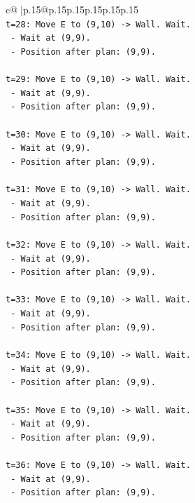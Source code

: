 \documentclass{article}
\begin{document}
{\begin{supertabular}{c@{$\;$}|p{.15\linewidth}@{}p{.15\linewidth}p{.15\linewidth}p{.15\linewidth}p{.15\linewidth}p{.15\linewidth}}
{{{\\ 
\texttt{t=28: Move E to (9,10) {-}> Wall. Wait.} \\
\texttt{   {-} Wait at (9,9).} \\
\texttt{   {-} Position after plan: (9,9).} \\
\\ 
\texttt{t=29: Move E to (9,10) {-}> Wall. Wait.} \\
\texttt{   {-} Wait at (9,9).} \\
\texttt{   {-} Position after plan: (9,9).} \\
\\ 
\texttt{t=30: Move E to (9,10) {-}> Wall. Wait.} \\
\texttt{   {-} Wait at (9,9).} \\
\texttt{   {-} Position after plan: (9,9).} \\
\\ 
\texttt{t=31: Move E to (9,10) {-}> Wall. Wait.} \\
\texttt{   {-} Wait at (9,9).} \\
\texttt{   {-} Position after plan: (9,9).} \\
\\ 
\texttt{t=32: Move E to (9,10) {-}> Wall. Wait.} \\
\texttt{   {-} Wait at (9,9).} \\
\texttt{   {-} Position after plan: (9,9).} \\
\\ 
\texttt{t=33: Move E to (9,10) {-}> Wall. Wait.} \\
\texttt{   {-} Wait at (9,9).} \\
\texttt{   {-} Position after plan: (9,9).} \\
\\ 
\texttt{t=34: Move E to (9,10) {-}> Wall. Wait.} \\
\texttt{   {-} Wait at (9,9).} \\
\texttt{   {-} Position after plan: (9,9).} \\
\\ 
\texttt{t=35: Move E to (9,10) {-}> Wall. Wait.} \\
\texttt{   {-} Wait at (9,9).} \\
\texttt{   {-} Position after plan: (9,9).} \\
\\ 
\texttt{t=36: Move E to (9,10) {-}> Wall. Wait.} \\
\texttt{   {-} Wait at (9,9).} \\
\texttt{   {-} Position after plan: (9,9).} \\
}}}
\end{supertabular}}
\end{document}
